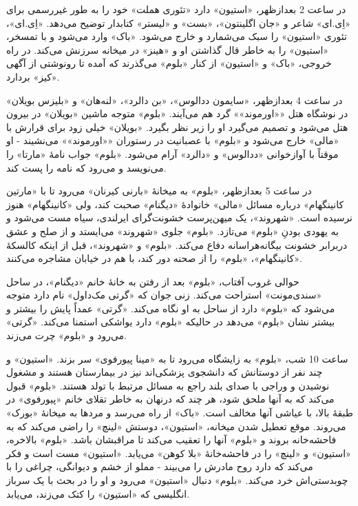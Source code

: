 \documentclass[12pt]{book}
\newcommand{\noun}[1]{«{#1}»}
\begin{document}
    در ساعت 2 بعدازظهر، \noun{استیون} دارد «تئوری هملت» خود را به طور غیررسمی برای \noun{اِی.ای} شاعر و \noun{جان اگلینتون}، \noun{بست} و \noun{لیستر} کتابدار توضیح می‌دهد. \noun{اِی.ای}، تئوری \noun{استیون} را سبک می‌شمارد و خارج می‌شود. \noun{باک} وارد می‌شود و با تمسخر، \noun{استیون} را به خاطر قال گذاشتن او و \noun{هینز} در میخانه سرزنش می‌کند. در راه خروجی، \noun{باک} و \noun{استیون} از کنار \noun{بلوم} می‌گذرند که آمده تا رونوشتی از آگهی \noun{کیز} بردارد.

    در ساعت 4 بعدازظهر، \noun{سایمون ددالوس}، \noun{بن دالرد}، \noun{لنه‌هان} و \noun{بلیزس بویلان} در نوشگاه هتل \noun{\noun{اورموند}} گرد هم می‌آیند. \noun{بلوم} متوجه ماشین \noun{بویلان} در بیرون هتل می‌شود و تصمیم می‌گیرد او را زیر نظر بگیرد. \noun{بویلان} خیلی زود برای قرارش با \noun{مالی} خارج می‌شود و \noun{بلوم} با عصبانیت در رستوران \noun{\noun{اورموند}} می‌نشیند - او موقتاً با آوازخوانی \noun{ددالوس} و \noun{دالرد} آرام می‌شود. \noun{بلوم} جواب نامۀ \noun{مارتا} را می‌نویسد و می‌رود که نامه را پست کند.

    در ساعت 5 بعدازظهر، \noun{بلوم} به میخانۀ \noun{بارنی کیرنان} می‌رود تا با \noun{مارتین کانینگهام} درباره مسائل \noun{مالی} خانوادۀ \noun{دیگنام} صحبت کند، ولی \noun{کانینگهام} هنوز نرسیده است. \noun{شهروند}، یک میهن‌پرست خشونت‌گرای ایرلندی، سیاه مست می‌شود و به یهودی بودنِ \noun{بلوم} می‌تازد. \noun{بلوم} جلوی \noun{شهروند} می‌ایستد و از صلح و عشق دربرابر خشونت بیگانه‌هراسانه دفاع می‌کند. \noun{بلوم} و \noun{شهروند}، قبل از اینکه کالسکۀ \noun{کانینگهام}، \noun{بلوم} را از صحنه دور کند، با هم در خیابان مشاجره می‌کنند.

    حوالی غروب آفتاب، \noun{بلوم} بعد از رفتن به خانۀ خانم \noun{دیگنام}، در ساحل \noun{سندی‌مونت} استراحت می‌کند. زنی جوان که \noun{گرتی مک‌داول} نام دارد متوجه می‌شود که \noun{بلوم} دارد از ساحل به او نگاه می‌کند. \noun{گرتی} عمداً پایش را بیشتر و بیشتر نشان \noun{بلوم} می‌دهد در حالیکه \noun{بلوم} دارد یواشکی استمنا می‌کند. \noun{گرتی} می‌رود و \noun{بلوم} چرت می‌زند.

    ساعت 10 شب، \noun{بلوم} به زایشگاه می‌رود تا به \noun{مینا پیورفوی} سر بزند. \noun{استیون} و چند نفر از دوستانش که دانشجوی پزشکی‌اند نیز در بیمارستان هستند و مشغول نوشیدن و وراجی با صدای بلند راجع به مسائل مرتبط با تولد هستند. \noun{بلوم} قبول می‌کند که به آنها ملحق شود، هر چند که درنهان به خاطر تقلای خانم \noun{پیورفوی} در طبقۀ بالا، با عیاشی آنها مخالف است. \noun{باک} از راه می‌رسد و مردها به میخانۀ \noun{بورک} می‌روند. موقع تعطیل شدن میخانه، \noun{استیون}، دوستش \noun{لینچ} را راضی می‌کند که به فاحشه‌خانه بروند و \noun{بلوم} آنها را تعقیب می‌کند تا مراقبشان باشد.
    \noun{بلوم} بالاخره، \noun{استیون} و \noun{لینچ} را در فاحشه‌خانۀ \noun{بلا کوهن} می‌یابد. \noun{استیون} مست است و فکر می‌کند که دارد روح مادرش را می‌بیند - مملو از خشم و دیوانگی، چراغی را با چوبدستی‌اش خرد می‌کند. \noun{بلوم} دنبال \noun{استیون} می‌رود و او را در بحث با یک سرباز انگلیسی که \noun{استیون} را کتک می‌زند، می‌یابد.
\end{document}
